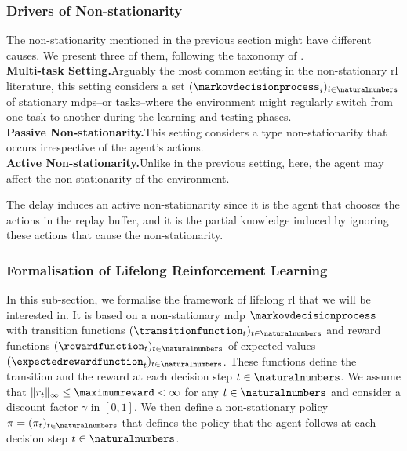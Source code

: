 \subsubsection{Drivers of Non-stationarity}
The non-stationarity mentioned in the previous section might have different causes. We present three of them, following the taxonomy of \cite{khetarpal2020towards}.\\
\noindent\textbf{Multi-task Setting.}\indent Arguably the most common setting in the non-stationary \gls{rl} literature, this setting considers a set $(\markovdecisionprocess_i)_{i\in\naturalnumbers}$ of stationary \glspl{mdp}--or tasks--where the environment might regularly switch from one task to another during the learning and testing phases.
\\ 
\noindent\textbf{Passive Non-stationarity.}\indent This setting considers a type non-stationarity that occurs irrespective of the agent's actions.
\\
\noindent\textbf{Active Non-stationarity.}\indent Unlike in the previous setting, here, the agent may affect the non-stationarity of the environment.

The delay induces an active non-stationarity since it is the agent that chooses the actions in the replay buffer, and it is the partial knowledge induced by ignoring these actions that cause the non-stationarity.

\subsubsection{Formalisation of Lifelong Reinforcement Learning}
In this sub-section, we formalise the framework of lifelong \gls{rl} that we will be interested in. 
It is based on a non-stationary \gls{mdp} $\markovdecisionprocess$ with transition functions $(\transitionfunction_t)_{t \in \naturalnumbers}$ and reward functions 
$(\rewardfunction_t)_{t \in \naturalnumbers}$ of expected values $(\expectedrewardfunction_t)_{t \in \naturalnumbers}$.
These functions define the transition and the reward at each decision step $t \in \naturalnumbers$. 
We assume that $\lVert r_t\rVert_{\infty} \le \maximumreward < \infty $ for any $t\in\naturalnumbers$ and consider a discount factor $\gamma$ in $[0,1]$.
We then define a non-stationary policy $\pi = (\pi_t)_{t \in \naturalnumbers}$ that defines the policy that the agent follows at each decision step $t\in\naturalnumbers$. 

